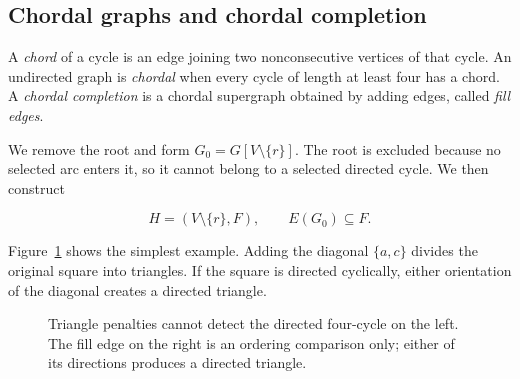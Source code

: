 \documentclass[10pt,a4paper]{article}
\begin{document}
\subsection{Chordal graphs and chordal completion}

A \emph{chord} of a cycle is an edge joining two nonconsecutive vertices of
that cycle. An undirected graph is \emph{chordal} when every cycle of length at
least four has a chord. A \emph{chordal completion} is a chordal supergraph
obtained by adding edges, called \emph{fill edges}.

We remove the root and form $G_0=G[V\setminus\{r\}]$. The root is excluded
because no selected arc enters it, so it cannot belong to a selected directed
cycle. We then construct

\begin{equation}
H=(V\setminus\{r\},F),
\qquad E(G_0)\subseteq F.
\label{eq:completion}
\end{equation}

Figure~\ref{fig:four-cycle} shows the simplest example. Adding the diagonal
$\{a,c\}$ divides the original square into triangles. If the square is
directed cyclically, either orientation of the diagonal creates a directed
triangle.

\begin{figure}[t]
\centering
{}
\caption{Triangle penalties cannot detect the directed four-cycle on the
left. The fill edge on the right is an ordering comparison only; either of its
directions produces a directed triangle.}
\label{fig:four-cycle}
\end{figure}
\end{document}
